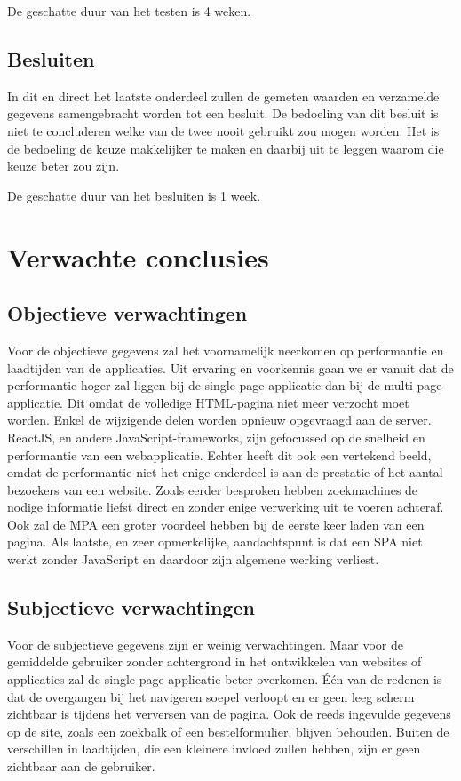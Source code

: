\documentclass{hogent-article}
\begin{document}
De geschatte duur van het testen is 4 weken.

\subsection{Besluiten}
In dit en direct het laatste onderdeel zullen de gemeten waarden en verzamelde gegevens samengebracht worden tot een besluit.
De bedoeling van dit besluit is niet te concluderen welke van de twee nooit gebruikt zou mogen worden.
Het is de bedoeling de keuze makkelijker te maken en daarbij uit te leggen waarom die keuze beter zou zijn.

De geschatte duur van het besluiten is 1 week.


\section{Verwachte conclusies}

\subsection{Objectieve verwachtingen}
Voor de objectieve gegevens zal het voornamelijk neerkomen op performantie en laadtijden van de applicaties.
Uit ervaring en voorkennis gaan we er vanuit dat de performantie hoger zal liggen bij de single page applicatie dan bij de multi page applicatie.
Dit omdat de volledige HTML-pagina niet meer verzocht moet worden. Enkel de wijzigende delen worden opnieuw opgevraagd aan de server.
ReactJS, en andere JavaScript-frameworks, zijn gefocussed op de snelheid en performantie van een webapplicatie.
Echter heeft dit ook een vertekend beeld, omdat de performantie niet het enige onderdeel is aan de prestatie of het aantal bezoekers van een website.
Zoals eerder besproken hebben zoekmachines de nodige informatie liefst direct en zonder enige verwerking uit te voeren achteraf.
Ook zal de MPA een groter voordeel hebben bij de eerste keer laden van een pagina.
Als laatste, en zeer opmerkelijke, aandachtspunt is dat een SPA niet werkt zonder JavaScript en daardoor zijn algemene werking verliest.

\subsection{Subjectieve verwachtingen}
Voor de subjectieve gegevens zijn er weinig verwachtingen.
Maar voor de gemiddelde gebruiker zonder achtergrond in het ontwikkelen van websites of applicaties zal de single page applicatie beter overkomen.
Één van de redenen is dat de overgangen bij het navigeren soepel verloopt en er geen leeg scherm zichtbaar is tijdens het verversen van de pagina.
Ook de reeds ingevulde gegevens op de site, zoals een zoekbalk of een bestelformulier, blijven behouden.
Buiten de verschillen in laadtijden, die een kleinere invloed zullen hebben, zijn er geen zichtbaar aan de gebruiker.
\end{document}
